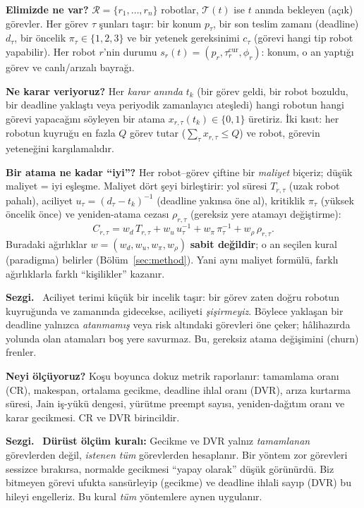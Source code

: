 \documentclass[11pt,a4paper]{article}
\newenvironment{sezgi}
  {\begin{lrbox}{\sezgibox}%
   \begin{minipage}{\dimexpr\linewidth-2\fboxsep-2\fboxrule\relax}%
   \small\textbf{\color{blue!55!black}Sezgi.}~}
  {\end{minipage}\end{lrbox}%
   \par\smallskip\noindent
   \fcolorbox{blue!45!black}{blue!5}{\usebox{\sezgibox}}%
   \par\smallskip}
\newcommand{\R}{\mathcal{R}}
\newcommand{\T}{\mathcal{T}}
\begin{document}
\textbf{Elimizde ne var?} $\R=\{r_1,\dots,r_n\}$ robotlar, $\T(t)$ ise $t$
anında bekleyen (açık) görevler. Her görev $\tau$ şunları taşır: bir konum
$p_\tau$, bir son teslim zamanı (deadline) $d_\tau$, bir öncelik
$\pi_\tau\in\{1,2,3\}$ ve bir yetenek gereksinimi $c_\tau$ (görevi hangi tip
robot yapabilir). Her robot $r$'nin durumu
$s_r(t)=(p_r,\tau_r^{\mathrm{cur}},\phi_r)$: konum, o an yaptığı görev ve
canlı/arızalı bayrağı.

\textbf{Ne karar veriyoruz?} Her \emph{karar anında} $t_k$ (bir görev geldi,
bir robot bozuldu, bir deadline yaklaştı veya periyodik zamanlayıcı ateşledi)
hangi robotun hangi görevi yapacağını söyleyen bir atama
$x_{r,\tau}(t_k)\in\{0,1\}$ üretiriz. İki kısıt: her robotun kuyruğu en fazla
$Q$ görev tutar ($\sum_\tau x_{r,\tau}\le Q$) ve robot, görevin yeteneğini
karşılamalıdır.

\textbf{Bir atama ne kadar ``iyi''?} Her robot--görev çiftine bir
\emph{maliyet} biçeriz; düşük maliyet = iyi eşleşme. Maliyet dört şeyi birleştirir:
yol süresi $T_{r,\tau}$ (uzak robot pahalı), aciliyet
$u_\tau=(d_\tau-t_k)^{-1}$ (deadline yakınsa öne al), kritiklik $\pi_\tau$
(yüksek öncelik önce) ve yeniden-atama cezası $\rho_{r,\tau}$ (gereksiz yere
atamayı değiştirme):
\begin{equation}
  C_{r,\tau} = w_d\,T_{r,\tau} + w_u\,u_\tau^{-1} + w_\pi\,\pi_\tau^{-1}
             + w_\rho\,\rho_{r,\tau}.
  \label{eq:cost}
\end{equation}
Buradaki ağırlıklar $w=(w_d,w_u,w_\pi,w_\rho)$ \textbf{sabit değildir};
o an seçilen kural (paradigma) belirler (Bölüm~\ref{sec:method}). Yani aynı
maliyet formülü, farklı ağırlıklarla farklı ``kişilikler'' kazanır.

\begin{sezgi}
Aciliyet terimi küçük bir incelik taşır: bir görev zaten doğru robotun
kuyruğunda ve zamanında gidecekse, aciliyeti \emph{şişirmeyiz}. Böylece
yaklaşan bir deadline yalnızca \emph{atanmamış} veya risk altındaki görevleri
öne çeker; hâlihazırda yolunda olan atamaları boş yere savurmaz. Bu, gereksiz
atama değişimini (churn) frenler.
\end{sezgi}

\textbf{Neyi ölçüyoruz?} Koşu boyunca dokuz metrik raporlanır: tamamlama oranı
(CR), makespan, ortalama gecikme, deadline ihlal oranı (DVR), arıza kurtarma
süresi, Jain iş-yükü dengesi, yürütme preempt sayısı, yeniden-dağıtım oranı ve
karar gecikmesi. CR ve DVR birincildir.

\begin{sezgi}
\textbf{Dürüst ölçüm kuralı:} Gecikme ve DVR yalnız \emph{tamamlanan}
görevlerden değil, \emph{istenen tüm} görevlerden hesaplanır. Bir yöntem zor
görevleri sessizce bırakırsa, normalde gecikmesi ``yapay olarak'' düşük
görünürdü. Biz bitmeyen görevi ufukta sansürleyip (gecikme) ve deadline ihlali
sayıp (DVR) bu hileyi engelleriz. Bu kural \emph{tüm} yöntemlere aynen
uygulanır.
\end{sezgi}
\end{document}
